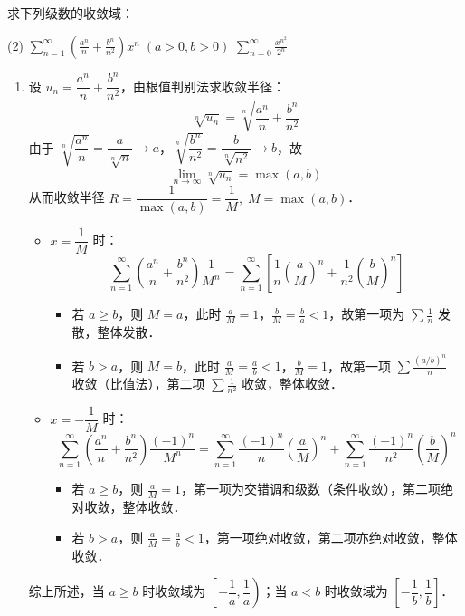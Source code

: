 \documentclass[12pt, a4paper, oneside, UTF8]{ctexbook}
\begin{document}
\begin{exercise}
    求下列级数的收敛域：
    \begin{tasks}[label=(\arabic*)](2)
        \task $\displaystyle\sum_{n=1}^{\infty}\left(\frac{a^n}{n}+\frac{b^n}{n^2}\right)x^n\;(a>0,b>0)$
        \task $\displaystyle\sum_{n=0}^{\infty}\frac{x^{n^2}}{2^n}$
    \end{tasks}
\end{exercise}
\begin{solution}
    \begin{enumerate}[label=(\arabic*)]
        \item 设 $u_n = \dfrac{a^n}{n}+\dfrac{b^n}{n^2}$，由根值判别法求收敛半径：
        \[ \sqrt[n]{u_n} = \sqrt[n]{\frac{a^n}{n} + \frac{b^n}{n^2}} \]
        由于 $\sqrt[n]{\dfrac{a^n}{n}} = \dfrac{a}{\sqrt[n]{n}} \to a$，$\sqrt[n]{\dfrac{b^n}{n^2}} = \dfrac{b}{\sqrt[n]{n^2}} \to b$，故
        \[ \lim_{n \to \infty} \sqrt[n]{u_n} = \max(a,b) \]
        从而收敛半径 $R = \dfrac{1}{\max(a,b)} = \dfrac{1}{M},\;M = \max(a,b)$．
        \begin{itemize}
            \item $x = \dfrac{1}{M}$ 时：
            \[ \sum_{n=1}^\infty \left(\frac{a^n}{n}+\frac{b^n}{n^2}\right)\frac{1}{M^n} = \sum_{n=1}^\infty \left[\frac{1}{n}\!\left(\frac{a}{M}\right)^{\!n} + \frac{1}{n^2}\!\left(\frac{b}{M}\right)^{\!n}\right] \]
            \begin{itemize}
                \item 若 $a \ge b$，则 $M = a$，此时 $\frac{a}{M} = 1$，$\frac{b}{M} = \frac{b}{a} < 1$，故第一项为 $\sum \frac{1}{n}$ 发散，整体发散．
                \item 若 $b > a$，则 $M = b$，此时 $\frac{a}{M} = \frac{a}{b} < 1$，$\frac{b}{M} = 1$，故第一项 $\sum \frac{(a/b)^n}{n}$ 收敛（比值法），第二项 $\sum \frac{1}{n^2}$ 收敛，整体收敛．
            \end{itemize}
            \item $x = -\dfrac{1}{M}$ 时：
            \[ \sum_{n=1}^\infty \left(\frac{a^n}{n}+\frac{b^n}{n^2}\right)\frac{(-1)^n}{M^n} = \sum_{n=1}^\infty \frac{(-1)^n}{n}\!\left(\frac{a}{M}\right)^{\!n} + \sum_{n=1}^\infty \frac{(-1)^n}{n^2}\!\left(\frac{b}{M}\right)^{\!n} \]
            \begin{itemize}
                \item 若 $a \ge b$，则 $\frac{a}{M} = 1$，第一项为交错调和级数（条件收敛），第二项绝对收敛，整体收敛．
                \item 若 $b > a$，则 $\frac{a}{M} = \frac{a}{b} < 1$，第一项绝对收敛，第二项亦绝对收敛，整体收敛．
            \end{itemize}
        \end{itemize}
        综上所述，当 $a \ge b$ 时收敛域为 $\boxed{\left[-\dfrac{1}{a},\dfrac{1}{a}\right)}$；当 $a < b$ 时收敛域为 $\boxed{\left[-\dfrac{1}{b},\dfrac{1}{b}\right]}$．


\end{enumerate}
\end{solution}
\end{document}
